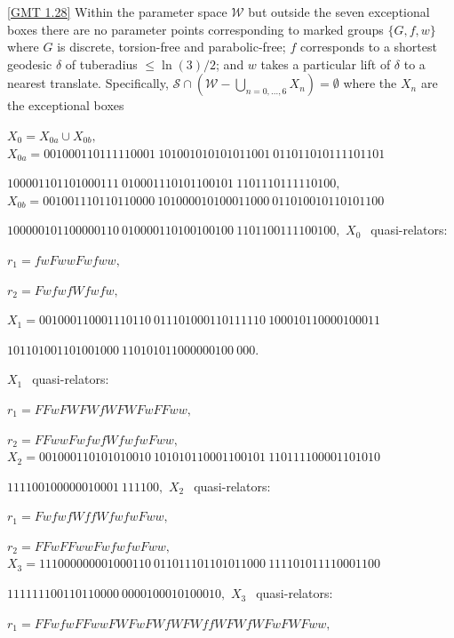 \begin{theorem}\ref{GMT 1.28}  
Within the parameter space $\mathcal {W}$ but outside the seven exceptional boxes there are no parameter points corresponding to 
marked groups $\{G,f,w\}$ where $G$ is 
discrete{\textrm ,} torsion\/{\textrm -}\/free and  parabolic\/{\textrm -}\/free\/{\textrm ;}
$f$ corresponds to a shortest geodesic $\delta$ of tuberadius $\le
\ln(3)/2${\textrm ;} and $w$ takes a particular lift of $\delta$ to 
a nearest translate.
 Specifically{\textrm ,} 
$\mathcal {S} \cap (\mathcal {W} - \bigcup_{n = 0,\dots, 6} X_n)=\emptyset$ where the $X_n$ are the exceptional boxes


 \noindent $X_0 = X_{0a} \cup X_{0b},$
\noindent $X_{0a} = 
001000110111110001\ 
101001010101011001\ 
011011010111101101$\hfill 

 
 \hfill
$100001101101000111\ 
010001110101100101\ 
1101110111110100,$  
 \noindent $X_{0b} = 
001001110110110000\ 
101000010100011000\ 
011010010110101100$

\hfill
$100000101100000110\ 
010000110100100100\ 
1101100111100100,$ 
 \vglue4pt
\noindent  $X_0\ \ $ quasi\/{\textrm -}\/relators\/{\textrm :}

$r_1 = fwFwwFwfww,$
 
$r_2 = FwfwfWfwfw,$

\vglue8pt
\noindent $X_1 = 
001000110001110110\ 
011101000110111110\ 
100010110000100011$\hfill 

\hfill $
101101001101001000\ 
110101011000000100\ 
000.$ 

\noindent $X_1\ \ 
$ quasi\/{\textrm -}\/relators\/{\textrm :}

$r_1 = FFwFWFWfWFWFwFFww,$
 
$r_2 = FFwwFwfwfWfwfwFww,$
\vglue4pt
\noindent $X_2 = 
001000110101010010\ 
101010110001100101\ 
110111100001101010$\hfill

\hfill $111100100000010001\ 
111100,$
\noindent $X_2\ \ $ quasi\/{\textrm -}\/relators\/{\textrm :}

$r_1 = FwfwfWffWfwfwFww,$

$r_2 = FFwFFwwFwfwfwFww,$
\noindent 
$X_3 = 
111000000001000110\ 
011011101101011000\ 
111101011110001100$\hfill

\hfill  
$111111100110110000\ 
0000100010100010,$
\noindent $X_3\ \ $ quasi\/{\textrm -}\/relators\/{\textrm :}\/

$r_1 = FFwfwFFwwFWFwFWfWFWffWFWfWFwFWFww,$ 


\end{theorem}
